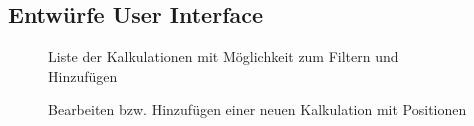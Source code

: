 \subsection{Entwürfe User Interface}
\label{app:Entwuerfe}
\begin{figure}[htb]
\centering
{}
\caption{Liste der Kalkulationen mit Möglichkeit zum Filtern und Hinzufügen}
\end{figure}

\begin{figure}[htb]
\centering
{}
\caption{Bearbeiten bzw. Hinzufügen einer neuen Kalkulation mit Positionen}
\end{figure}
